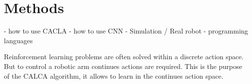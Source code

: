 \section{Methods}

- how to use CACLA
- how to use CNN
- Simulation / Real robot
- programming languages


Reinforcement learning problems are often solved within a discrete action space. But to control a robotic arm continues actions are required. This is the purpose of the CALCA
algorithm, it allows to learn in the continues action space.


